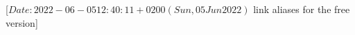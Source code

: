 %
%
%
%
%
%
%

                 [$Date: 2022-06-05 12:40:11 +0200 (Sun, 05 Jun 2022) $
                  link aliases for the free version]

\makeatletter
\newcommand*{\lalias}[3][]{%
  \scr@ifundefinedorrelax{r@#3}{%
    \ClassWarning{scrguide}{%
      Label alias `#2'\MessageBreak
      to `#3' ignored,\MessageBreak
      because `#3' undefined%
    }%
  }{%
    \scr@ifundefinedorrelax{r@#2}{%
      \IfArgIsEmpty{#1}{%
        \expandafter\let\csname r@#2\expandafter\endcsname
        \csname r@#3\endcsname
      }{%
        \expandafter\let\expandafter\reserved@a\csname r@#3\endcsname
        \expandafter\expandafter\expandafter\def
        \expandafter\expandafter\expandafter\reserved@a
        \expandafter\expandafter\expandafter{\expandafter\@gobble\reserved@a}%
        \expandafter\edef\csname r@#2\endcsname{%
          {\unexpanded{#1}}\unexpanded\expandafter{\reserved@a}%
        }%
      }%
    }{%
      \ClassWarning{scrguide}{%
        Label alias `#2'\MessageBreak
        to `#3' ignored,\MessageBreak
        because of multiply definition%
      }%
      \gdef \@multiplelabels {%
        \@latex@warning@no@line{There were multiply-defined labels}}%
    }%
  }%
}
\makeatother

